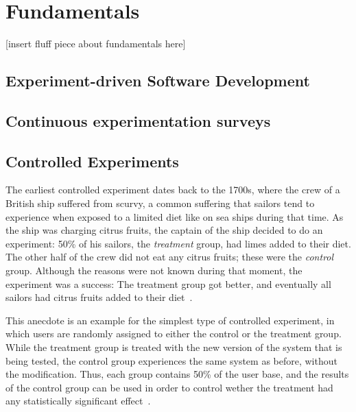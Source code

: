 %
\chapter{Fundamentals}
\label{sec:fundamentals}

[insert fluff piece about fundamentals here]

\section{Experiment-driven Software Development}
\label{sec:fundamentals:edsd}

\cite{Olsson2012}

\section{Continuous experimentation surveys}
\label{sec:related:surveys}

\cite{lindgren2015software}

\cite{Bosch2012}

\cite{Gutbrod2017}

\section{Controlled Experiments}
\label{sec:fundamentals:experiments}

The earliest controlled experiment dates back to the 1700s, where the crew of a British ship suffered from scurvy, a common suffering that sailors tend to experience when exposed to a limited diet like on sea ships during that time.
As the ship was charging citrus fruits, the captain of the ship decided to do an experiment: 50\% of his sailors, the \emph{treatment} group, had limes added to their diet.
The other half of the crew did not eat any citrus fruits; these were the \emph{control} group.
Although the reasons were not known during that moment, the experiment was a success: The treatment group got better, and eventually all sailors had citrus fruits added to their diet~\cite{rossi2003evaluation,marks2000progress}.

This anecdote is an example for the simplest type of controlled experiment, in which users are randomly assigned to either the control or the treatment group.
While the treatment group is treated with the new version of the system that is being tested, the control group experiences the same system as before, without the modification.
Thus, each group contains 50\% of the user base, and the results of the control group can be used in order to control wether the treatment had any statistically significant effect~\cite{Kohavi2009}.

